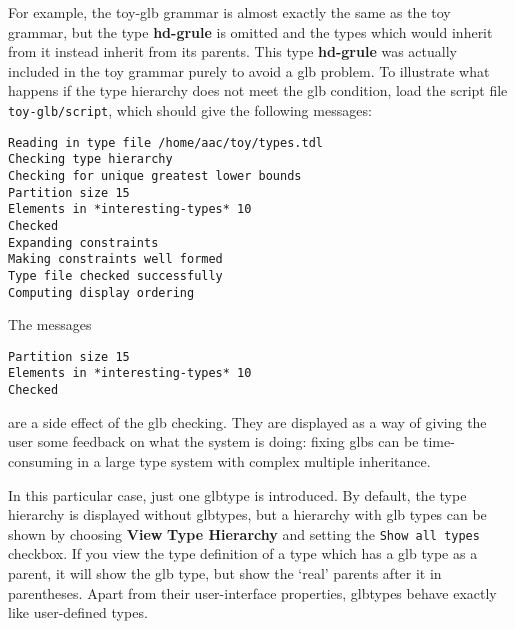 \documentclass[12pt]{report}
\begin{document}
For example, the toy-glb
grammar is almost exactly the same as the toy grammar, but the
type {\bf hd-grule} is omitted and the types which would inherit
from it instead inherit from its parents.  This type {\bf hd-grule}
was actually included in the toy grammar purely to
avoid a glb problem.  To illustrate what happens if the type hierarchy does not
meet the glb condition,
load the script file {\tt toy-glb/script}, which should give the following
messages:
\begin{verbatim}
Reading in type file /home/aac/toy/types.tdl
Checking type hierarchy
Checking for unique greatest lower bounds
Partition size 15
Elements in *interesting-types* 10
Checked
Expanding constraints
Making constraints well formed
Type file checked successfully
Computing display ordering
\end{verbatim}
The messages 
\begin{verbatim}
Partition size 15
Elements in *interesting-types* 10
Checked
\end{verbatim}
are a side effect of the glb checking.  They are displayed as a way
of giving the user some feedback on what the system is doing:
fixing glbs can be time-consuming in a large type system with
complex multiple inheritance.

In this particular case, just one glbtype is introduced.
By default, the type hierarchy is displayed
without glbtypes, but a hierarchy with glb types
can be shown by choosing
{\bf View} {\bf Type Hierarchy} and setting the {\tt Show all types}
checkbox.
If you view the type definition of a type which has a glb type as a parent,
it will show the glb type, but show the `real' parents after it 
in parentheses.
Apart from their user-interface properties, 
glbtypes behave exactly like user-defined types.
\end{document}
